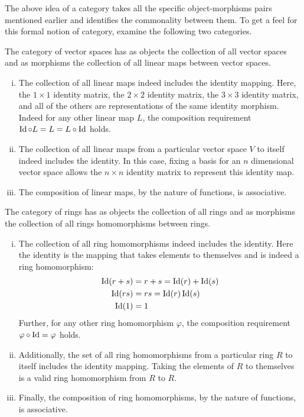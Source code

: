 \documentclass[../sean_thesis.tex]{subfiles}
\begin{document}
The above idea of a category takes all the specific object-morphisms pairs mentioned earlier and identifies the commonality between them. To get a feel for this formal notion of category, examine the following two categories.

\begin{example}
	The category of vector spaces has as objects the collection of all vector spaces and as morphisms the collection of all linear maps between vector spaces.
	\vspace{-\varparskip}
	\begin{enumerate}[(i)]
		\item The collection of all linear maps indeed includes the identity mapping. Here, the $1\times 1$ identity matrix, the $2 \times 2$ identity matrix, the $3 \times 3$ identity matrix, and all of the others are representations of the same identity morphism. Indeed for any other linear map $L$, the composition requirement $\operatorname{Id} \circ L = L = L \circ \operatorname{Id}$ holds.
		\item The collection of all linear maps from a particular vector space $V$ to itself indeed includes the identity. In this case, fixing a basis for an $n$ dimensional vector space allows the $n\times n$ identity matrix to represent this identity map.
		\item The composition of linear maps, by the nature of functions, is associative.
	\end{enumerate}
\end{example}

\begin{example}
	The category of rings has as objects the collection of all  rings and as morphisms the collection of all rings homomorphisms between rings.
	\vspace{-\varparskip}
	\begin{enumerate}[(i)]
		\item The collection of all ring homomorphisms indeed includes the identity. Here the identity is the mapping that takes elements to themselves and is indeed a ring homomorphism:
		\begin{align*}
			\operatorname{Id}(r+s) &= r+s = \operatorname{Id}(r)+\operatorname{Id}(s)\\
			\operatorname{Id}(rs) &= rs = \operatorname{Id}(r)\operatorname{Id}(s)\\
			\operatorname{Id}(1) &= 1
		\end{align*}
		Further, for any other ring homomorphism $\varphi$, the composition requirement $\varphi \circ \operatorname{Id} = \varphi$ holds.
		\item Additionally, the set of all ring homomorphisms from a particular ring $R$ to itself includes the identity mapping. Taking the elements of $R$ to themselves is a valid ring homomorphism from $R$ to $R$.
		\item Finally, the composition of ring homomorphisms, by the nature of functions, is associative.
	\end{enumerate}
\end{example}
\end{document}
